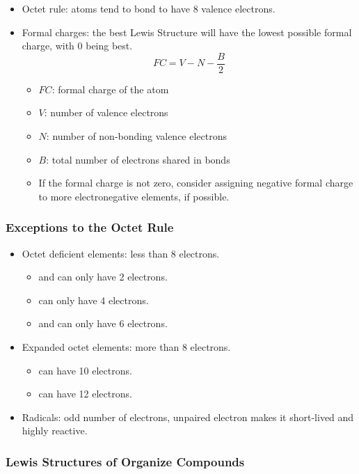 \documentclass{article}
\begin{document}
\begin{itemize}
    \item Octet rule: atoms tend to bond to have 8 valence electrons.
    \item Formal charges: the best Lewis Structure will have the lowest possible formal charge, with 0 being best.
\[FC = V - N - \frac{B}{2}\]
    \begin{itemize}
        \item $FC$: formal charge of the atom
        \item $V$: number of valence electrons
        \item $N$: number of non-bonding valence electrons
        \item $B$: total number of electrons shared in bonds
        \item If the formal charge is not zero, consider assigning negative formal charge to more electronegative elements, if possible.
    \end{itemize}
\end{itemize}

\subsubsection{Exceptions to the Octet Rule}

\begin{itemize}
    \item Octet deficient elements: less than 8 electrons.
    \begin{itemize}
        \item {} and  can only have 2 electrons.
        \item {} can only have 4 electrons.
        \item {} and  can only have 6 electrons.
    \end{itemize}
    \item Expanded octet elements: more than 8 electrons.
    \begin{itemize}
        \item {} can have 10 electrons.
        \item {} can have 12 electrons.
    \end{itemize}
    \item Radicals: odd number of electrons, unpaired electron makes it short-lived and highly reactive.
\end{itemize}

\subsubsection{Lewis Structures of Organize Compounds}
\end{document}
